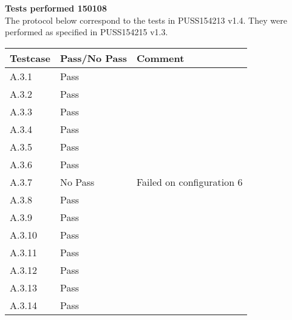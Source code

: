 \renewcommand{\testdate}{150108}
\textbf{ Tests performed \testdate} \\
The protocol below correspond to the tests in PUSS154213 v1.4. They were performed as specified in PUSS154215 v1.3.
\begin{center}
  	\begin{tabular}{| p{3cm} | p{5cm} | p{5cm} |}
    		\hline
	    	\textbf{Testcase}			& \textbf{Pass/No Pass} 	& \textbf{Comment} \\ \hline
    		A.3.1		 						& Pass 										&  				\\ \hline
    		A.3.2		 						& Pass 										& 				 \\	\hline
    		A.3.3		 						& Pass 										& 				 \\	\hline
    		A.3.4		 						& Pass 										& 				 \\	\hline
    		A.3.5		 						& Pass 										& 				 \\	\hline
    		A.3.6		 						& Pass 										& 				 \\	\hline
    		A.3.7		 						& No Pass 										& Failed on configuration 6				 \\	\hline
    		A.3.8		 						& Pass 										& 				 \\	\hline
    		A.3.9		 						& Pass 										& 				 \\	\hline
    		A.3.10	 							& Pass 										& 				 \\	\hline
    		A.3.11	 							& Pass 										& 				 \\	\hline
    		A.3.12	 							& Pass 										& 				 \\	\hline
    		A.3.13	 							& Pass 										& 				 \\	\hline
    		A.3.14	 							& Pass 										& 				 \\	\hline
 	\end{tabular}
\end{center}